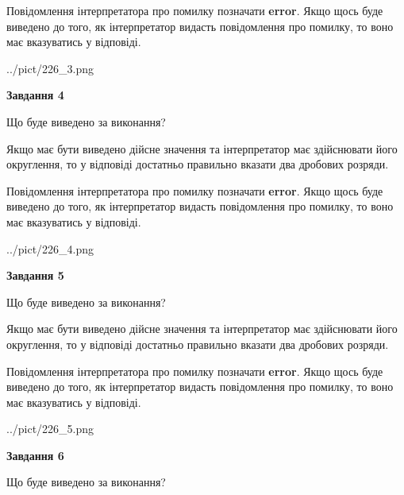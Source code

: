 \documentclass[12pt, ukrainian]{article}
\begin{document}
{\begin {Large}
Повідомлення інтерпретатора про помилку позначати \textbf{error}.
Якщо щось буде виведено до того, як інтерпретатор видасть повідомлення про помилку, 
то воно має вказуватись у відповіді. \par

\begin{center}
	{../pict/226_3.png}
\end{center}
\newpage

{\begin {center}\textbf{Завдання 4}\end {center}}\par
Що буде виведено за виконання? \par

Якщо має бути виведено дійсне значення та інтерпретатор має здійснювати його округлення, 
то у відповіді достатньо правильно вказати два дробових розряди.

Повідомлення інтерпретатора про помилку позначати \textbf{error}.
Якщо щось буде виведено до того, як інтерпретатор видасть повідомлення про помилку, 
то воно має вказуватись у відповіді. \par

\begin{center}
	{../pict/226_4.png}
\end{center}
\newpage

{\begin {center}\textbf{Завдання 5}\end {center}}\par
Що буде виведено за виконання? \par

Якщо має бути виведено дійсне значення та інтерпретатор має здійснювати його округлення, 
то у відповіді достатньо правильно вказати два дробових розряди.

Повідомлення інтерпретатора про помилку позначати \textbf{error}.
Якщо щось буде виведено до того, як інтерпретатор видасть повідомлення про помилку, 
то воно має вказуватись у відповіді. \par

\begin{center}
	{../pict/226_5.png}
\end{center}
\newpage

{\begin {center}\textbf{Завдання 6}\end {center}}\par
Що буде виведено за виконання? \par


\end{Large}}
\end{document}
